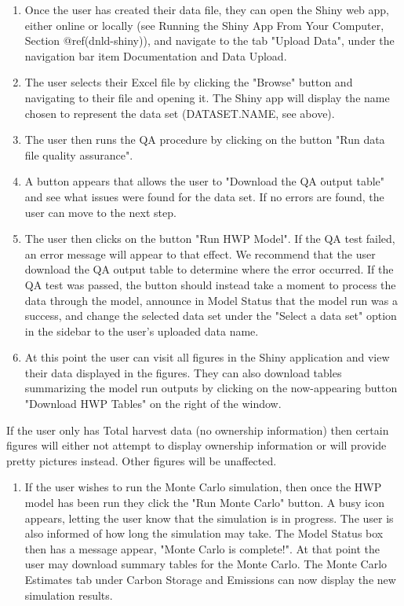 \documentclass[
  openany]{book}
\providecommand{\tightlist}{%
  \setlength{\itemsep}{0pt}\setlength{\parskip}{0pt}}
\begin{document}
\begin{enumerate}
\def\labelenumi{\arabic{enumi}.}
\item
  Once the user has created their data file, they can open the Shiny web
  app, either online or locally (see Running the Shiny App From Your
  Computer, Section @ref(dnld-shiny)), and navigate to the tab "Upload
  Data", under the navigation bar item Documentation and Data Upload.
\item
  The user selects their Excel file by clicking the "Browse" button and
  navigating to their file and opening it. The Shiny app will display
  the name chosen to represent the data set (DATASET.NAME, see above).
\item
  The user then runs the QA procedure by clicking on the button "Run
  data file quality assurance".
\item
  A button appears that allows the user to "Download the QA output
  table" and see what issues were found for the data set. If no errors
  are found, the user can move to the next step.
\item
  The user then clicks on the button "Run HWP Model". If the QA test
  failed, an error message will appear to that effect. We recommend that
  the user download the QA output table to determine where the error
  occurred. If the QA test was passed, the button should instead take a
  moment to process the data through the model, announce in Model Status
  that the model run was a success, and change the selected data set
  under the "Select a data set" option in the sidebar to the user's
  uploaded data name.
\item
  At this point the user can visit all figures in the Shiny application
  and view their data displayed in the figures. They can also download
  tables summarizing the model run outputs by clicking on the
  now-appearing button "Download HWP Tables" on the right of the window.
\end{enumerate}

If the user only has Total harvest data (no ownership information) then
certain figures will either not attempt to display ownership information
or will provide pretty pictures instead. Other figures will be
unaffected.

\begin{enumerate}
\def\labelenumi{\arabic{enumi}.}
\setcounter{enumi}{6}
\tightlist
\item
  If the user wishes to run the Monte Carlo simulation, then once the
  HWP model has been run they click the "Run Monte Carlo" button. A busy
  icon appears, letting the user know that the simulation is in
  progress. The user is also informed of how long the simulation may
  take. The Model Status box then has a message appear, "Monte Carlo is
  complete!". At that point the user may download summary tables for the
  Monte Carlo. The Monte Carlo Estimates tab under Carbon Storage and
  Emissions can now display the new simulation results.
\end{enumerate}
\end{document}
